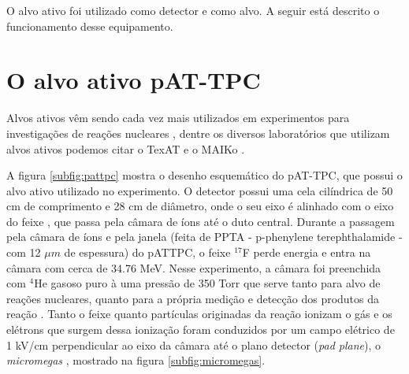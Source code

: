 \documentclass[a4paper,12pt,oneside]{book}
\begin{document}
\par O alvo ativo foi utilizado como detector e como alvo. A seguir está descrito o funcionamento desse equipamento.

\section{O alvo ativo pAT-TPC}


\par Alvos ativos vêm sendo cada vez mais utilizados em experimentos para investigações de reações nucleares \cite{FORTINO2022166497}, dentre os diversos laboratórios que utilizam alvos ativos podemos citar o TexAT \cite{KOSHCHIY2020163398} e o MAIKo \cite{FURUNO2018215}.

\par A figura \ref{subfig:pattpc} mostra o desenho esquemático do pAT-TPC, que possui o alvo ativo utilizado no experimento. O detector possui uma cela cilíndrica de 50 cm de comprimento e 28 cm de diâmetro, onde o seu eixo é alinhado com o eixo do feixe \cite{pattpc}, que passa pela câmara de íons até o duto central. Durante a passagem pela câmara de íons e pela janela (feita de PPTA - p-phenylene terephthalamide - com 12 $\mu m$ de espessura) do pATTPC, o feixe $^{17}$F perde energia e entra na câmara com cerca de 34.76 MeV. Nesse experimento, a câmara foi preenchida com $^4$He gasoso puro à uma pressão de 350 Torr que serve tanto para alvo de reações nucleares, quanto para a própria medição e detecção dos produtos da reação \cite{pattpc, pattpc2}. Tanto o feixe quanto partículas originadas da reação ionizam o gás e os elétrons que surgem dessa ionização foram conduzidos por um campo elétrico de 1 kV/cm perpendicular ao eixo da câmara até o plano detector (\textit{pad plane}), o \textit{micromegas} \cite{micromegas}, mostrado na figura \ref{subfig:micromegas}.
\end{document}
